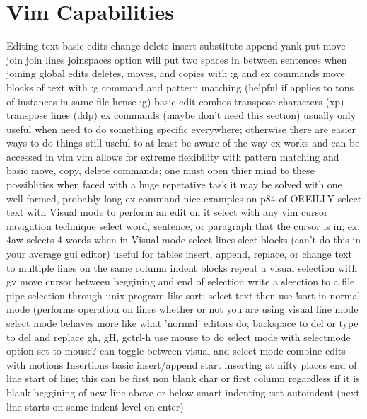 \documentclass[12pt]{book}
\begin{document}
\section{Vim Capabilities}
Editing text
  basic edits
    change
    delete
    insert
    substitute
    append
    yank
    put
    move
    join
      join lines
        joinspaces option will put two spaces in between sentences when joining
    global edits
      deletes, moves, and copies with :g and ex commands
      move blocks of text
        with :g command and pattern matching (helpful if applies to tons of instances in same file hense :g)
    basic edit combos
      transpose characters (xp)
      transpose lines (ddp)
    ex commands (maybe don't need this section)
      usually only useful when need to do something specific everywhere; otherwise there are easier ways to do things
      still useful to at least be aware of the way ex works and can be accessed in vim
      vim allows for extreme flexibility with pattern matching and basic move, copy, delete commands; one must open thier mind to these possiblities when faced with a huge repetative task
      it may be solved with one well-formed, probably long ex command
      nice examples on p84 of OREILLY
    select text with Visual mode to perform an edit on it
      select with any vim cursor navigation technique
      select word, sentence, or paragraph that the cursor is in; ex. 4aw selects 4 words when in Visual mode
      select lines
      slect blocks (can't do this in your average gui editor)
        useful for tables
        insert, append, replace, or change text to multiple lines on the same column
        indent blocks
      repeat a visual selection with gv
      move cursor between beggining and end of selection
      write a sleection to a file
      pipe selection through unix program like sort: select text then use !sort in normal mode (performs operation on lines whether or not you are using visual line mode
      select mode
        behaves more like what 'normal' editors do; backspace to del or type to del and replace
        gh, gH, gctrl-h
        use mouse to do select mode with selectmode option set to mouse?
        can toggle between visual and select mode
    combine edits with motions
  Insertions
    basic insert/append
      start inserting at nifty places
        end of line
        start of line; this can be first non blank char or first column regardless if it is blank
        beggining of new line above or below
        smart indenting
          :set autoindent (next line starts on same indent level on enter)
\end{document}
